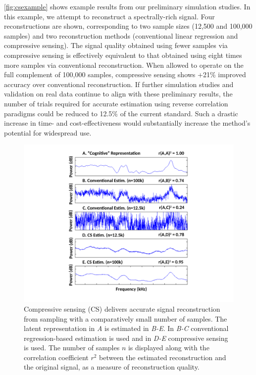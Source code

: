 \documentclass[11pt, notitlepage]{article} %
\begin{document}
\autoref{fig:csexample} shows example results from our preliminary simulation studies.
In this example, we attempt to reconstruct a spectrally-rich signal.
Four reconstructions are shown, corresponding to two sample sizes (12,500 and 100,000 samples)
and two reconstruction methods (conventional linear regression and compressive sensing).
The signal quality obtained using fewer samples via compressive sensing
is effectively equivalent to that obtained using eight times more samples
via conventional reconstruction.
When allowed to operate on the full complement of 100,000 samples,
compressive sensing shows +21\% improved accuracy over conventional reconstruction.
If further simulation studies and validation on real data continue to align with these preliminary results,
the number of trials required for accurate estimation using reverse correlation paradigms
could be reduced to 12.5\% of the current standard.
Such a drastic increase in time- and cost-effectiveness would substantially
increase the method's potential for widespread use.

\begin{figure}[h] %
	\centering
	\includegraphics[width=\textwidth]{Figures/CompSensExamples.pdf}
	\caption{Compressive sensing (CS) delivers accurate signal reconstruction from sampling
	with a comparatively small number of samples.
	The latent representation in \emph{A} is estimated in \emph{B-E}.
	In \emph{B-C} conventional regression-based estimation is used
	and in \emph{D-E} compressive sensing is used.
	The number of samples $n$ is displayed along with the correlation coefficient $r^2$
	between the estimated reconstruction and the original signal,
	as a measure of reconstruction quality.}
	\label{fig:csexample}
\end{figure}
\end{document}
